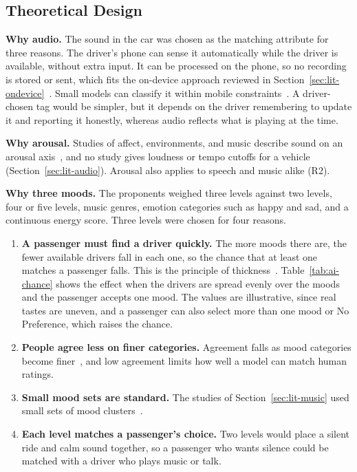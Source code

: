 \subsection{Theoretical Design}
\label{sec:ai-theory}
\textbf{Why audio.} The sound in the car was chosen as the matching attribute for three reasons. The driver's phone can sense it automatically while the driver is available, without extra input. It can be processed on the phone, so no recording is stored or sent, which fits the on-device approach reviewed in Section~\ref{sec:lit-ondevice}~\cite{zhao2022survey}. Small models can classify it within mobile constraints~\cite{lane2015deep}. A driver-chosen tag would be simpler, but it depends on the driver remembering to update it and reporting it honestly, whereas audio reflects what is playing at the time.

\textbf{Why arousal.} Studies of affect, environments, and music describe sound on an arousal axis~\cite{russell1980circumplex,russell1980environments,panda2023audio}, and no study gives loudness or tempo cutoffs for a vehicle (Section~\ref{sec:lit-audio}). Arousal also applies to speech and music alike (R2).

\textbf{Why three moods.} The proponents weighed three levels against two levels, four or five levels, music genres, emotion categories such as happy and sad, and a continuous energy score. Three levels were chosen for four reasons.
\begin{enumerate}
    \item \textbf{A passenger must find a driver quickly.} The more moods there are, the fewer available drivers fall in each one, so the chance that at least one matches a passenger falls. This is the principle of thickness~\cite{roth2008market}. Table~\ref{tab:ai-chance} shows the effect when the drivers are spread evenly over the moods and the passenger accepts one mood. The values are illustrative, since real tastes are uneven, and a passenger can also select more than one mood or No Preference, which raises the chance.
    \item \textbf{People agree less on finer categories.} Agreement falls as mood categories become finer~\cite{hu2008mirex,gomez2019emotions}, and low agreement limits how well a model can match human ratings.
    \item \textbf{Small mood sets are standard.} The studies of Section~\ref{sec:lit-music} used small sets of mood clusters~\cite{hu2008mirex,hu2007simplified}.
    \item \textbf{Each level matches a passenger's choice.} Two levels would place a silent ride and calm sound together, so a passenger who wants silence could be matched with a driver who plays music or talk.
\end{enumerate}

